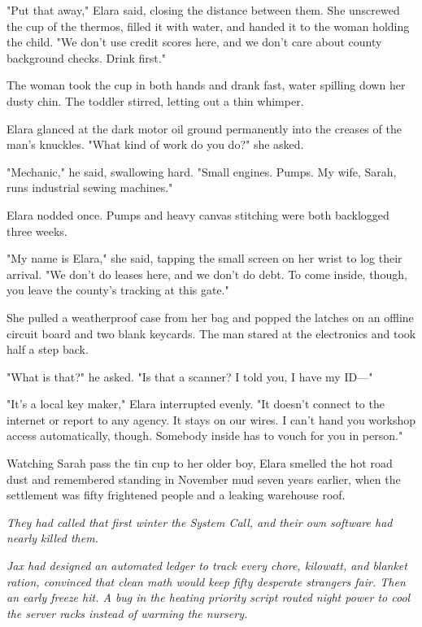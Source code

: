 "Put that away," Elara said, closing the distance between them. She unscrewed the cup of the thermos, filled it with water, and handed it to the woman holding the child. "We don't use credit scores here, and we don't care about county background checks. Drink first."

The woman took the cup in both hands and drank fast, water spilling down her dusty chin. The toddler stirred, letting out a thin whimper.

Elara glanced at the dark motor oil ground permanently into the creases of the man's knuckles. "What kind of work do you do?" she asked.

"Mechanic," he said, swallowing hard. "Small engines. Pumps. My wife, Sarah, runs industrial sewing machines."

Elara nodded once. Pumps and heavy canvas stitching were both backlogged three weeks.

"My name is Elara," she said, tapping the small screen on her wrist to log their arrival. "We don't do leases here, and we don't do debt. To come inside, though, you leave the county's tracking at this gate."

She pulled a weatherproof case from her bag and popped the latches on an offline circuit board and two blank keycards. The man stared at the electronics and took half a step back.

"What is that?" he asked. "Is that a scanner? I told you, I have my ID—"

"It's a local key maker," Elara interrupted evenly. "It doesn't connect to the internet or report to any agency. It stays on our wires. I can't hand you workshop access automatically, though. Somebody inside has to vouch for you in person."

Watching Sarah pass the tin cup to her older boy, Elara smelled the hot road dust and remembered standing in November mud seven years earlier, when the settlement was fifty frightened people and a leaking warehouse roof.

\bigskip

\textit{They had called that first winter the System Call, and their own software had nearly killed them.}

\textit{Jax had designed an automated ledger to track every chore, kilowatt, and blanket ration, convinced that clean math would keep fifty desperate strangers fair. Then an early freeze hit. A bug in the heating priority script routed night power to cool the server racks instead of warming the nursery.}

